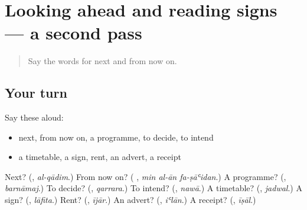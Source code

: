 \section[(dialogue)]{Looking ahead and reading signs — a second pass}

\label{lesson:AR-R158-second-pass-looking-ahead-and-reading-signs}



\begin{quote}
Say the words for next and from now on.
\end{quote}

\subsection*{Your turn}
Say these aloud:

\begin{itemize}
\raggedright
  \item next, from now on, a programme, to decide, to intend
  \item a timetable, a sign, rent, an advert, a receipt
\end{itemize}

\begin{tcolorbox}[breakable,colback=teal!4,colframe=teal!35!black,title={Before you move on}]
Next? (\textbf{}, \emph{al-qādim}.) From now on? (\textbf{  }, \emph{min al-ān fa-ṣāʿidan}.) A programme? (\textbf{}, \emph{barnāmaj}.) To decide? (\textbf{}, \emph{qarrara}.) To intend? (\textbf{}, \emph{nawā}.) A timetable? (\textbf{}, \emph{jadwal}.) A sign? (\textbf{}, \emph{lāfita}.) Rent? (\textbf{}, \emph{ījār}.) An advert? (\textbf{}, \emph{iʿlān}.) A receipt? (\textbf{}, \emph{īṣāl}.)
\end{tcolorbox}
